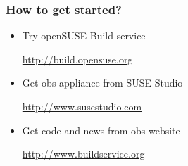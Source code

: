 \begin{frame}[t]
   \frametitle{How to get started?}
   \begin{itemize}
      \item Try openSUSE Build service
      \vspace{0.1cm}
      \begin{center}\url{http://build.opensuse.org}\end{center}
      \vspace{0.1cm}
      \item Get obs appliance from SUSE Studio
      \vspace{0.1cm}
      \begin{center}\url{http://www.susestudio.com}\end{center}
      \vspace{0.1cm}
      \item Get code and news from obs website
      \vspace{0.1cm}
      \begin{center}\url{http://www.buildservice.org}\end{center}
   \end{itemize}
\end{frame}

